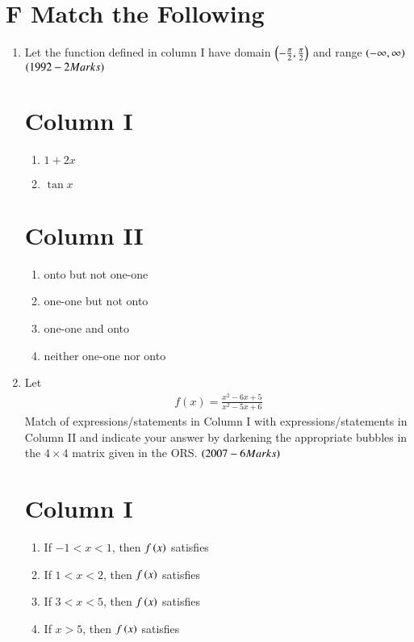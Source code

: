 \documentclass[journal,12pt,onecolumn,article]{IEEEtran}
\theoremstyle{remark}
\begin{document}
	\section*{F Match the Following}
	\begin{enumerate}
		\item Let the function defined in column I have domain $\left(-\frac{\pi}{2},\frac{\pi}{2}\right)$ and range $\left(-\infty,\infty\right)$ \hfill${\left(1992-2 Marks\right)}$
			\begin{multicols}{2} 
				\section*{Column I}
				\begin{enumerate}[label=(\Alph*)]
					\item $1+2x$
					\item $\tan x$
				\end{enumerate}
				\columnbreak
				 \section*{Column II}
				\begin{enumerate}[label=(\alph*),start=16]
					\item onto but not one-one
					\item one-one but not onto
					\item one-one and onto
					\item neither one-one nor onto
				\end{enumerate}
			\end{multicols}
				\item Let 
					\begin{align}
						f(x)=\frac{x^2-6x+5}{x^2-5x+6}
					\end{align}
					 Match of expressions/statements in Column I with expressions/statements in Column II and indicate your answer by darkening the appropriate bubbles in the $4\times4$ matrix given in the ORS. \hfill{$\left(2007-6 Marks\right)$}
	
			              \begin{multicols}{2}
					      \section*{ Column I}
						\begin{enumerate}[label=(\Alph*)]
							\item If $-1<x<1$, then $f\left(x\right)$ satisfies
							\item If $1<x<2$, then $f\left(x\right)$ satisfies
							\item If $3<x<5$, then $f\left(x\right)$ satisfies
							\item If $x>5$, then $f\left(x\right)$ satisfies
						\end{enumerate}
						\columnbreak

\end{multicols}
\end{enumerate}
\end{document}
